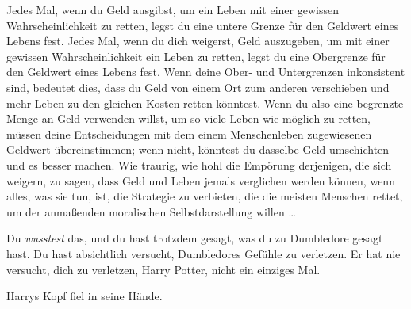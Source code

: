 \begin{em}
Jedes Mal, wenn du Geld ausgibst, um ein Leben mit einer gewissen Wahrscheinlichkeit zu retten, legst du eine untere Grenze für den Geldwert eines Lebens fest. Jedes Mal, wenn du dich weigerst, Geld auszugeben, um mit einer gewissen Wahrscheinlichkeit ein Leben zu retten, legst du eine Obergrenze für den Geldwert eines Lebens fest. Wenn deine Ober- und Untergrenzen inkonsistent sind, bedeutet dies, dass du Geld von einem Ort zum anderen verschieben und mehr Leben zu den gleichen Kosten retten könntest. Wenn du also eine begrenzte Menge an Geld verwenden willst, um so viele Leben wie möglich zu retten, müssen deine Entscheidungen mit dem einem Menschenleben zugewiesenen Geldwert übereinstimmen; wenn nicht, könntest du dasselbe Geld umschichten und es besser machen. Wie traurig, wie hohl die Empörung derjenigen, die sich weigern, zu sagen, dass Geld und Leben jemals verglichen werden können, wenn alles, was sie tun, ist, die Strategie zu verbieten, die die meisten Menschen rettet, um der anmaßenden moralischen Selbstdarstellung willen …



Du \emph{wusstest} das, und du hast trotzdem gesagt, was du zu Dumbledore gesagt hast. Du hast absichtlich versucht, Dumbledores Gefühle zu verletzen. Er hat nie versucht, dich zu verletzen, Harry Potter, nicht ein einziges Mal.
\end{em}
Harrys Kopf fiel in seine Hände.

